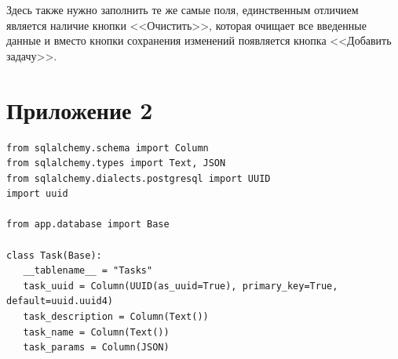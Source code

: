 \documentclass{altsu-report}
\begin{document}
Здесь также нужно заполнить те же самые поля, единственным отличием является наличие кнопки <<Очистить>>, которая очищает все введенные данные и вместо кнопки сохранения изменений появляется кнопка <<Добавить задачу>>.


\chapter*{Приложение 2}

\begin{code}
\label{code:pi-example}
\begin{verbatim}
from sqlalchemy.schema import Column
from sqlalchemy.types import Text, JSON
from sqlalchemy.dialects.postgresql import UUID
import uuid

from app.database import Base

class Task(Base):
   __tablename__ = "Tasks"
   task_uuid = Column(UUID(as_uuid=True), primary_key=True, default=uuid.uuid4)
   task_description = Column(Text())
   task_name = Column(Text())
   task_params = Column(JSON)
\end{verbatim}
\end{code}
\end{document}
